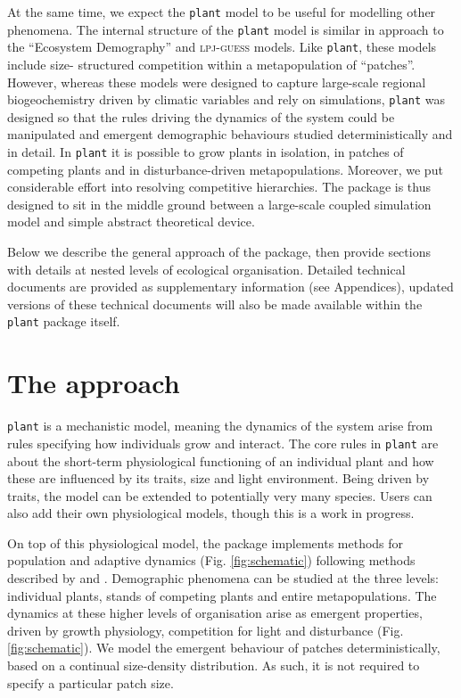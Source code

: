 \documentclass[a4paper,11pt]{article}
\newcommand{\plant}{\texttt{plant}}
\begin{document}
At the same time, we expect the {\plant} model to be useful for
modelling other phenomena. The internal structure of the {\plant}
model is similar in approach to the ``Ecosystem Demography''
\citep{Moorcroft-2001} and \textsc{lpj-guess} \citep{Smith-2014}
models. Like {\plant}, these models include size- structured
competition within a metapopulation of ``patches''. However, whereas
these models were designed to capture large-scale regional
biogeochemistry driven by climatic variables and rely on simulations,
{\plant} was designed so that the rules driving the dynamics of the
system could be manipulated and emergent demographic behaviours
studied deterministically and in detail. In {\plant} it is possible to grow plants in
isolation, in patches of competing plants and in disturbance-driven
metapopulations. Moreover, we put considerable effort into resolving
competitive hierarchies. 
The package is thus designed to sit in the middle
ground between a large-scale coupled simulation model and simple
abstract theoretical device. 

Below we describe the general approach of the package, then provide
sections with details at nested levels of ecological organisation.
Detailed technical documents are provided as supplementary information
(see Appendices), updated versions of these technical documents will also
be made available within the {\plant} package itself.

\section{The approach}

{\plant} is a mechanistic model, meaning the dynamics of the system
arise from rules specifying how individuals grow and interact.  The
core rules in {\plant} are about the short-term physiological
functioning of an individual plant and how these are influenced by its
traits, size and light environment. Being driven by traits, the model
can be extended to potentially very many species. Users can also add
their own physiological models, though this is a work in progress.

On top of this physiological model, the package implements methods for
population and adaptive dynamics (Fig.  \ref{fig:schematic}) following methods
described by \citet{Falster-2011} and \citet{Falster-2015}. Demographic
phenomena can be studied at the three levels: individual plants, stands of
competing plants and entire metapopulations. The dynamics at these higher
levels of organisation arise as emergent properties, driven by growth
physiology, competition for light and disturbance (Fig.  \ref{fig:schematic}).
We model the emergent behaviour of patches deterministically, based on a
continual  size-density distribution. As such, it is not required to specify a
particular patch size.
\end{document}
